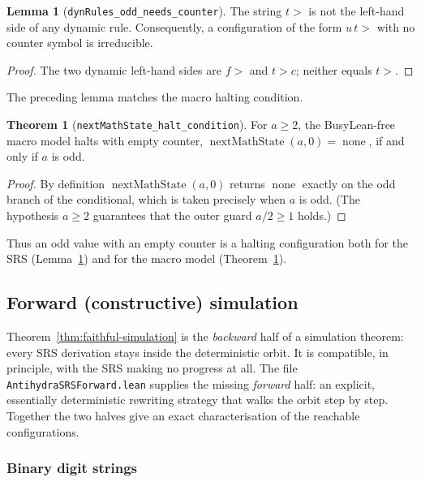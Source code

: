 \documentclass[11pt,a4paper]{article}
\theoremstyle{definition}
\newtheorem{lemma}[definition]{Lemma}
\newtheorem{theorem}[definition]{Theorem}
\newcommand{\gt}{>}
\newcommand{\nextMathState}{\operatorname{nextMathState}}
\newcommand{\none}{\operatorname{none}}
\begin{document}
\begin{lemma}[\texttt{dynRules\_odd\_needs\_counter}]
  \label{lem:odd-halt-redex}
  The string $t\gt$ is not the left-hand side of any dynamic rule.
  Consequently, a configuration of the form $u\,t\gt$ with no counter
  symbol is irreducible.
\end{lemma}
\begin{proof}
  The two dynamic left-hand sides are $f\gt$ and $t\gt c$; neither
  equals $t\gt$.
\end{proof}

The preceding lemma matches the macro halting condition.

\begin{theorem}[\texttt{nextMathState\_halt\_condition}]
  \label{thm:halt-bridge}
  For $a\ge2$, the BusyLean-free macro model halts with empty counter,
  $\nextMathState(a,0)=\none$, if and only if $a$ is odd.
\end{theorem}
\begin{proof}
  By definition $\nextMathState(a,0)$ returns $\none$ exactly on the
  odd branch of the conditional, which is taken precisely when $a$ is
  odd.  (The hypothesis $a\ge2$ guarantees that the outer guard
  $a/2\ge1$ holds.)
\end{proof}

Thus an odd value with an empty counter is a halting configuration both
for the SRS (Lemma~\ref{lem:odd-halt-redex}) and for the macro model
(Theorem~\ref{thm:halt-bridge}).

\subsection{Forward (constructive) simulation}
\label{subsec:lean-forward}

Theorem~\ref{thm:faithful-simulation} is the \emph{backward} half of a
simulation theorem: every SRS derivation stays inside the deterministic
orbit.  It is compatible, in principle, with the SRS making no progress
at all.  The file \texttt{AntihydraSRSForward.lean} supplies the missing
\emph{forward} half: an explicit, essentially deterministic rewriting
strategy that walks the orbit step by step.  Together the two halves give
an exact characterisation of the reachable configurations.

\subsubsection{Binary digit strings}
\end{document}
